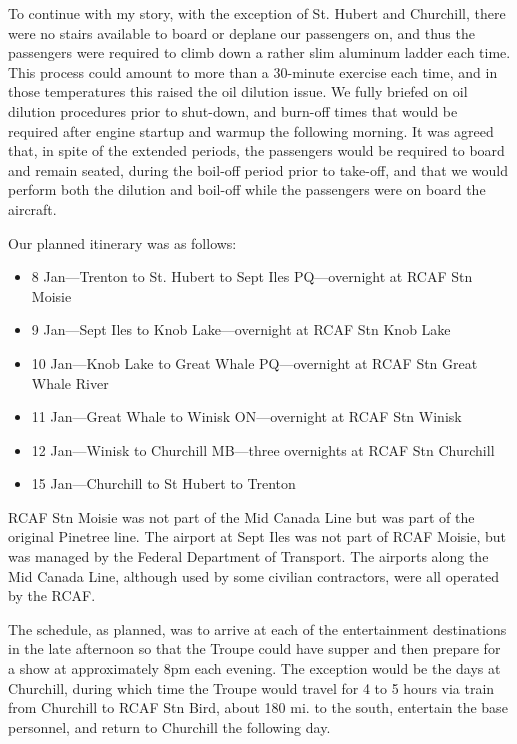 To continue with my story, with the exception of St. Hubert and
Churchill, there were no stairs available to board or deplane our
passengers on, and thus the passengers were required to climb down a
rather slim aluminum ladder each time. This process could amount to
more than a 30-minute exercise each time, and in those temperatures
this raised the oil dilution issue. We fully briefed on oil dilution
procedures prior to shut-down, and burn-off times that would be
required after engine startup and warmup the following morning. It was
agreed that, in spite of the extended periods, the passengers would be
required to board and remain seated, during the boil-off period prior
to take-off, and that we would perform both the dilution and boil-off
while the passengers were on board the aircraft.

Our planned itinerary was as follows:

\begin{itemize}
  \item 8 Jan---Trenton to St. Hubert to Sept Iles PQ---overnight at RCAF Stn
Moisie 
  \item 9 Jan---Sept Iles to Knob Lake---overnight at RCAF Stn Knob Lake
  \item 10 Jan---Knob Lake to Great Whale PQ---overnight at RCAF Stn Great
Whale River 
  \item 11 Jan---Great Whale to Winisk ON---overnight at RCAF Stn
Winisk 
  \item 12 Jan---Winisk to Churchill MB---three overnights at RCAF Stn
Churchill 
  \item 15 Jan---Churchill to St Hubert to Trenton
\end{itemize}

RCAF Stn Moisie was not part of the Mid Canada Line but was part of the
original Pinetree line. The airport at Sept Iles was not part of RCAF
Moisie, but was managed by the Federal Department of Transport. The
airports along the Mid Canada Line, although used by some civilian
contractors, were all operated by the RCAF.

The schedule, as planned, was to arrive at each of the entertainment
destinations in the late afternoon so that the Troupe could have supper
and then prepare for a show at approximately 8pm each evening. The
exception would be the days at Churchill, during which time the Troupe
would travel for 4 to 5 hours via train from Churchill to RCAF Stn
Bird, about 180 mi. to the south, entertain the base personnel, and
return to Churchill the following day.

